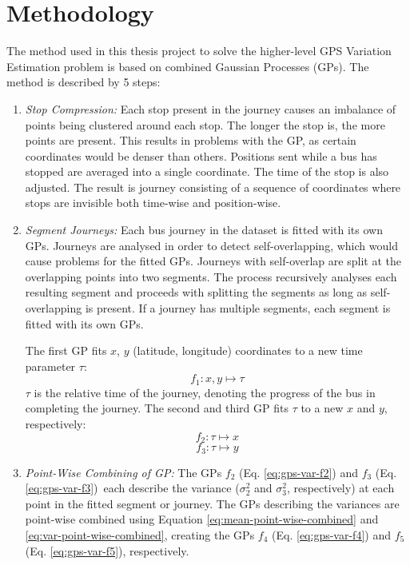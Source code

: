 \section{Methodology}

The method used in this thesis project to solve the higher-level GPS Variation Estimation problem is based on combined Gaussian Processes (GPs).
The method is described by 5 steps:

\begin{enumerate}
    \item \textit{Stop Compression:}
    Each stop present in the journey causes an imbalance of points being clustered around each stop.
    The longer the stop is, the more points are present.
    This results in problems with the GP, as certain coordinates would be denser than others.
    Positions sent while a bus has stopped are averaged into a single coordinate.
    The time of the stop is also adjusted.
    The result is journey consisting of a sequence of coordinates where stops are invisible both time-wise and position-wise.

    \item \textit{Segment Journeys:}
    Each bus journey in the dataset is fitted with its own GPs.
    Journeys are analysed in order to detect self-overlapping, which would cause problems for the fitted GPs.
    Journeys with self-overlap are split at the overlapping points into two segments.
    The process recursively analyses each resulting segment and proceeds with splitting the segments as long as self-overlapping is present.
    If a journey has multiple segments, each segment is fitted with its own GPs.

    The first GP fits $x$, $y$ (latitude, longitude) coordinates to a new time parameter $\tau$:
    \begin{equation} \label{eq:gps-var-f1}
       f_1: x, y \longmapsto \tau
    \end{equation}
    $\tau$ is the relative time of the journey, denoting the progress of the bus in completing the journey.
    The second and third GP fits $\tau$ to a new $x$ and $y$, respectively:
    \begin{equation} \label{eq:gps-var-f2}
        f_2: \tau \longmapsto x
    \end{equation}
    \begin{equation} \label{eq:gps-var-f3}
        f_3: \tau \longmapsto y
    \end{equation}

    \item \textit{Point-Wise Combining of GP:}
    The GPs $f_2$ (Eq. \ref{eq:gps-var-f2}) and $f_3$ (Eq. \ref{eq:gps-var-f3}) each describe the variance ($\sigma_2^2$ and $\sigma_3^2$, respectively) at each point in the fitted segment or journey.
    The GPs describing the variances are point-wise combined using Equation \ref{eq:mean-point-wise-combined} and \ref{eq:var-point-wise-combined}, creating the GPs $f_4$ (Eq. \ref{eq:gps-var-f4}) and $f_5$ (Eq. \ref{eq:gps-var-f5}), respectively.
    

\end{enumerate}
